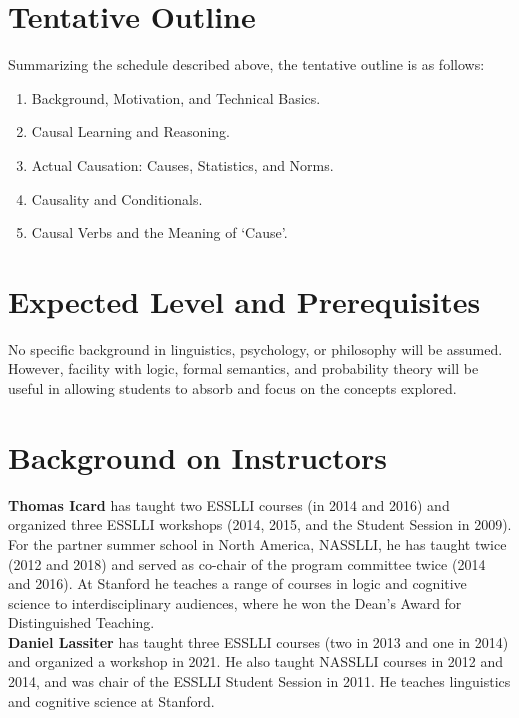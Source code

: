 \documentclass[english]{article}
\begin{document}

\section*{\large{Tentative Outline}}

Summarizing the schedule described above, the tentative outline is as follows:

\normalsize{
\begin{enumerate}
  \item Background, Motivation, and Technical Basics.
  \item Causal Learning and Reasoning.
  \item Actual Causation: Causes, Statistics, and Norms.
  \item Causality and Conditionals.
  \item Causal Verbs and the Meaning of `Cause'.
\end{enumerate}
}

\section*{\large{Expected Level and Prerequisites}}
No specific background in linguistics, psychology, or philosophy will be assumed. However, facility with logic, formal semantics, and probability theory will be useful in allowing students to absorb and focus on the concepts explored. 


\section*{\large{Background on Instructors}}

\textbf{Thomas Icard} has taught two ESSLLI courses (in 2014 and 2016) and organized three ESSLLI workshops (2014, 2015, and the Student Session in 2009). For the partner summer school in North America, NASSLLI, he has taught twice (2012 and 2018) and served as co-chair of the program committee twice (2014 and 2016). At Stanford he teaches a range of courses in logic and cognitive science to interdisciplinary audiences, where he won the Dean's Award for Distinguished Teaching. \\

\noindent \textbf{Daniel Lassiter} has taught three ESSLLI courses (two in 2013 and one in 2014) and organized a workshop in 2021. He also taught NASSLLI courses in 2012 and 2014, and was chair of the ESSLLI Student Session in 2011. He teaches linguistics and cognitive science at Stanford. 
 



 
\end{document}
